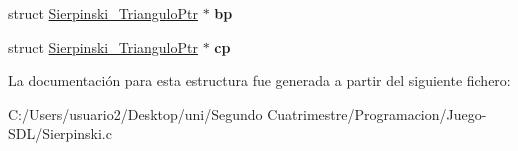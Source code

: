 \begin{DoxyCompactItemize}
\item 
struct \hyperlink{struct_sierpinski___triangulo_ptr}{Sierpinski\+\_\+\+Triangulo\+Ptr} $\ast$ {\bfseries bp}\hypertarget{struct_sierpinski___triangulo_ptr_a6472368a8b09f6ffa68f691606bca12d}{}\label{struct_sierpinski___triangulo_ptr_a6472368a8b09f6ffa68f691606bca12d}

\item 
struct \hyperlink{struct_sierpinski___triangulo_ptr}{Sierpinski\+\_\+\+Triangulo\+Ptr} $\ast$ {\bfseries cp}\hypertarget{struct_sierpinski___triangulo_ptr_ac5b912e209ad24f9546dab0b4775b4e1}{}\label{struct_sierpinski___triangulo_ptr_ac5b912e209ad24f9546dab0b4775b4e1}

\end{DoxyCompactItemize}


La documentación para esta estructura fue generada a partir del siguiente fichero\+:\begin{DoxyCompactItemize}
\item 
C\+:/\+Users/usuario2/\+Desktop/uni/\+Segundo Cuatrimestre/\+Programacion/\+Juego-\/\+S\+D\+L/Sierpinski.\+c\end{DoxyCompactItemize}
